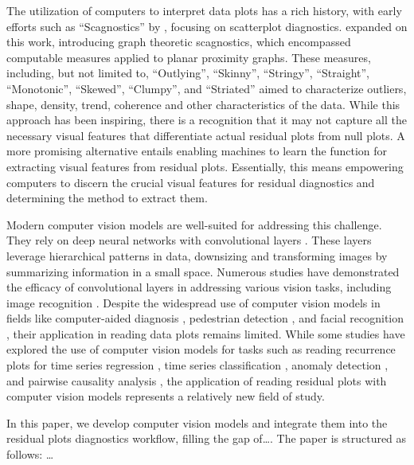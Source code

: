 \documentclass[]{interact}
\theoremstyle{plain}%
\theoremstyle{definition}
\theoremstyle{remark}
\begin{document}
The utilization of computers to interpret data plots has a rich history,
with early efforts such as ``Scagnostics'' by \citet{tukey1985computer},
focusing on scatterplot diagnostics. \citet{wilkinson2005graph} expanded
on this work, introducing graph theoretic scagnostics, which encompassed
computable measures applied to planar proximity graphs. These measures,
including, but not limited to, ``Outlying'', ``Skinny'', ``Stringy'',
``Straight'', ``Monotonic'', ``Skewed'', ``Clumpy'', and ``Striated''
aimed to characterize outliers, shape, density, trend, coherence and
other characteristics of the data. While this approach has been
inspiring, there is a recognition \citep{buja2009statistical} that it
may not capture all the necessary visual features that differentiate
actual residual plots from null plots. A more promising alternative
entails enabling machines to learn the function for extracting visual
features from residual plots. Essentially, this means empowering
computers to discern the crucial visual features for residual
diagnostics and determining the method to extract them.

Modern computer vision models are well-suited for addressing this
challenge. They rely on deep neural networks with convolutional layers
\citep{fukushima1982neocognitron}. These layers leverage hierarchical
patterns in data, downsizing and transforming images by summarizing
information in a small space. Numerous studies have demonstrated the
efficacy of convolutional layers in addressing various vision tasks,
including image recognition \citep{rawat2017deep}. Despite the
widespread use of computer vision models in fields like computer-aided
diagnosis \citep{lee2015image}, pedestrian detection
\citep{brunetti2018computer}, and facial recognition
\citep{emami2012facial}, their application in reading data plots remains
limited. While some studies have explored the use of computer vision
models for tasks such as reading recurrence plots for time series
regression \citep{ojeda2020multivariate}, time series classification
\citep{chu2019automatic, hailesilassie2019financial, hatami2018classification, zhang2020encoding},
anomaly detection \citep{chen2020convolutional}, and pairwise causality
analysis \citep{singh2017deep}, the application of reading residual
plots with computer vision models represents a relatively new field of
study.

In this paper, we develop computer vision models and integrate them into
the residual plots diagnostics workflow, filling the gap of\ldots. The
paper is structured as follows: \ldots{}
\end{document}
